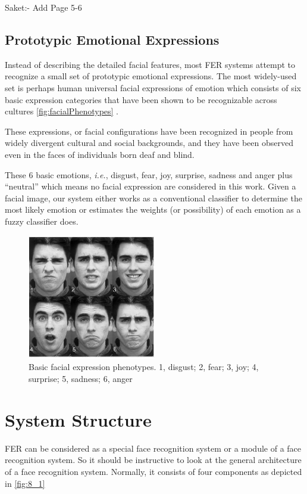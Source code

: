 \documentclass[12pt, twoside]{report}
\begin{document}
Saket:- Add Page 5-6

\subsection*{Prototypic Emotional Expressions}
Instead of describing the detailed facial features, most FER systems attempt to recognize a small set of prototypic emotional expressions. The most widely-used set is perhaps human universal facial expressions of emotion which consists of six basic expression categories that have been shown to be recognizable across cultures \ref{fig:facialPhenotypes} .

These expressions, or facial configurations have been recognized in people from widely divergent cultural and social backgrounds, and they have been observed even in the faces of individuals born deaf and blind.

These 6 basic emotions, \textit{i.e.}, disgust, fear, joy, surprise, sadness and anger plus ``neutral'' which means no facial expression are considered in this work. Given a facial image, our system either works as a conventional classifier to determine the most likely emotion or estimates the weights (or possibility) of each emotion as a fuzzy classifier does.

\begin{figure}[h]
    \centering
    \includegraphics[width=0.5\textwidth]{img/7_1.png}
    \caption{Basic facial expression phenotypes. 1, disgust; 2, fear; 3, joy; 4, surprise; 5, sadness; 6, anger}
    \label{fig:7_1}
\end{figure}

\section{System Structure}
FER can be considered as a special face recognition system or a module of a face recognition system. So it should be instructive to look at the general architecture of a face recognition system. Normally, it consists of four components as depicted in \ref{fig:8_1}
\end{document}
